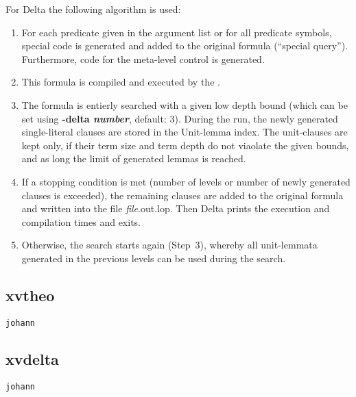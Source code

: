 For {\sc Delta} the following algorithm is used:
\begin{enumerate}
\item
For each predicate given in the argument list or for all predicate
symbols, special code
is generated and added to the original formula (``special query'').
Furthermore, code for the meta-level control is generated.
\item
This formula is compiled and executed by the \SAM.

\item
The formula is entierly searched with a given low depth bound (which can be
set using {\bf -delta {\em number\/}}, default: 3).
During the run, the newly generated single-literal clauses are stored
in the Unit-lemma index.
The unit-clauses are kept only, if their term size and term depth do
not viaolate the given bounds, and as long the limit of generated lemmas
is reached.
\item
If a stopping condition is met (number of levels or number of
newly generated clauses is exceeded), the remaining clauses
are added to the original formula and written into the file
{\em file}.out.lop.
Then
{\sc Delta}
prints the execution and compilation times and exits.
\item
Otherwise, the search starts again (Step~3), whereby all unit-lemmata
generated in the previous levels can be used during the search.
\end{enumerate}

\subsection{xvtheo}
{\tt johann}
\subsection{xvdelta}
{\tt johann}
